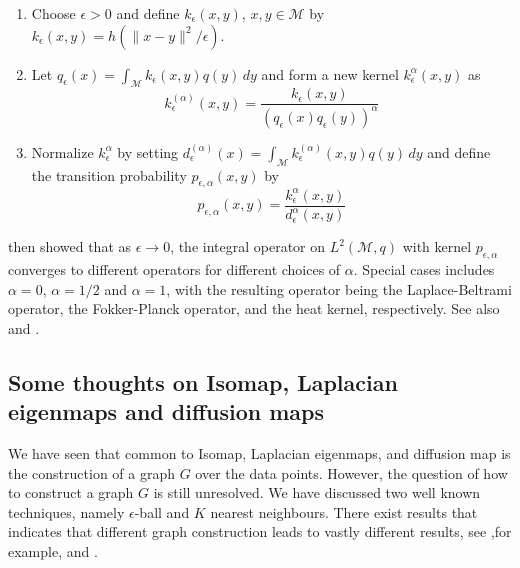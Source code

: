 \begin{enumerate}
\item Choose $\epsilon > 0$ and define $k_{\epsilon}(x,y)$, $x,y
  \in \mathcal{M}$ by $k_{\epsilon}(x,y) = h(\| x - y \|^2/\epsilon)$.
\item Let $q_{\epsilon}(x) = \int_{\mathcal{M}}{k_{\epsilon}(x,y) q(y)
    \,d y}$ and
  form a new kernel $k_{\epsilon}^{\alpha}(x,y)$ as
  \begin{equation}
    \label{eq:95}
    k_{\epsilon}^{(\alpha)}(x,y) =
    \frac{k_{\epsilon}(x,y)}{(q_{\epsilon}(x) q_{\epsilon}(y))^{\alpha}}
  \end{equation}
\item Normalize $k_{\epsilon}^{\alpha}$ by setting
  $d_{\epsilon}^{(\alpha)}(x) = \int_{\mathcal{M}}{k_{\epsilon}^{(\alpha)}(x,y) q(y)
    \, d y}$ and define the transition probability
    $p_{\epsilon,\alpha}(x,y)$ by
    \begin{equation}
      \label{eq:96}
      p_{\epsilon,\alpha}(x,y) = \frac{k_{\epsilon}^{\alpha}(x,y)}{d_{\epsilon}^{\alpha}(x,y)}
    \end{equation}
\end{enumerate}
\citet{coifman06:_diffus_maps} then showed that as $\epsilon
\rightarrow 0$, the integral operator on $L^{2}(\mathcal{M},q)$ with
kernel $p_{\epsilon,\alpha}$ converges to different operators for
different choices of $\alpha$. Special cases includes $\alpha = 0$,
$\alpha = 1/2$ and $\alpha = 1$, with the resulting operator being the
Laplace-Beltrami operator, the Fokker-Planck operator, and the heat
kernel, respectively. See also
\citet{nadler05:_diffus_eigen_fokker_planc_operat} and
\citet{nadler06:_diffus}.

\subsection{Some thoughts on Isomap, Laplacian eigenmaps and diffusion maps}
\label{sec:some-thoughts-isomap}
We have seen that common to Isomap, Laplacian eigenmaps, and diffusion
map is the construction of a graph $G$ over the data points.  However,
the question of how to construct a graph $G$ is still unresolved. We
have discussed two well known techniques, namely $\epsilon$-ball and
$K$ nearest neighbours. There exist results that indicates that
different graph construction leads to vastly different results, see
,for example, \citet{maier08:_influen} and \citet{maier09:_optim_k}.


